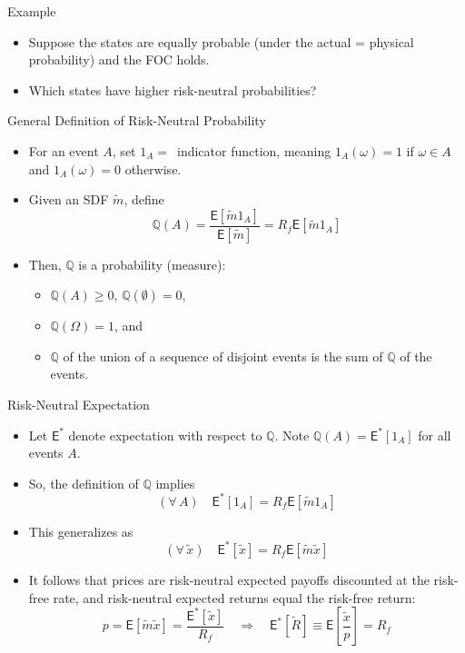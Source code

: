\documentclass[10pt]{beamer}
\newcommand{\bi}{\begin{itemize}}
\newcommand{\ei}{\end{itemize}}
\newcommand{\im}{\item}
\newcommand{\mye}{\ensuremath{\mathsf{E}}}
\newcommand{\tx}{\tilde{x}}
\newcommand{\tm}{\tilde{m}}
\newcommand{\qr}{\mathbb{Q}}
\begin{document}
\begin{frame}{Example}
    \bi 
    \im Suppose the states are equally probable (under the actual = physical probability) and the FOC holds. 
    \im Which states have higher risk-neutral probabilities?
    \ei
\end{frame}


\begin{frame}{General Definition of Risk-Neutral Probability}
\bi 
\im For an event $A$, set $1_A=\,$ indicator function, meaning $1_A(\omega) = 1$ if $\omega \in A$ and $1_A(\omega) = 0$ otherwise.
\im Given an SDF $\tm$, define 
$$\qr(A) = \frac{ \mye[\tilde{m}1_A]}{\mye[\tm]} = R_f \mye[\tilde{m}1_A]$$
\im Then, $\qr$ is a probability (measure): 
\bi 
\im $\qr(A) \geq 0$, $\qr(\emptyset)=0$, 
\im $\qr(\Omega)=1$, and 
\im $\qr$ of the union of a sequence of disjoint events is the sum of $\qr$ of the events. 
\ei
\ei 
\end{frame}

\begin{frame}{Risk-Neutral Expectation}
    \bi 
\im Let $\mye^*$ denote expectation with respect to $\qr$.  Note $\qr(A) = \mye^*[1_A]$ for all events $A$.  
\im So, the definition of $\qr$ implies
$$(\forall\, A) \quad \mye^*[1_A] = R_f \mye[\tm 1_A]$$

\im This generalizes as
$$(\forall\, \tx) \quad \mye^*[\tx] = R_f \mye[\tm \tx]$$


\im It follows that prices are risk-neutral expected payoffs discounted at the risk-free rate, and risk-neutral expected returns equal the risk-free return: 
$$p = \mye[\tm\tx] = \frac{\mye^*[\tx]}{R_f} \quad \Rightarrow \quad \mye^*[\tilde{R}] \equiv \mye\left[\frac{\tx}{p}\right] = R_f$$
\ei
\end{frame}
\end{document}
